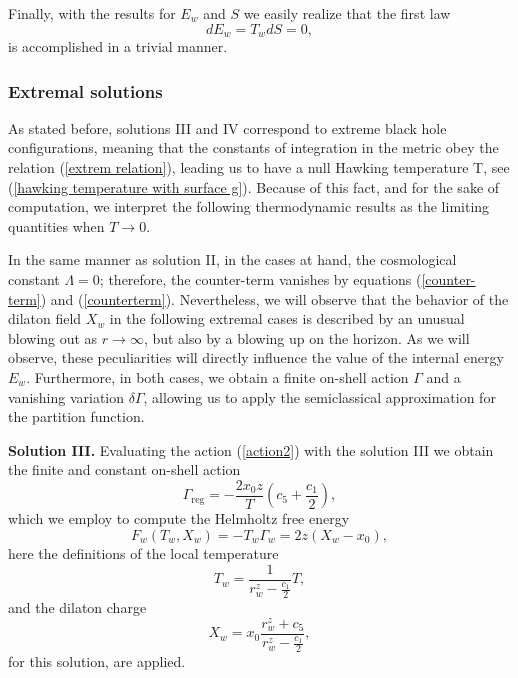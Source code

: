 \documentclass[sn-mathphys,Numbered]{sn-jnl}%
\theoremstyle{thmstyleone}%
\theoremstyle{thmstyletwo}%
\theoremstyle{thmstylethree}%
\begin{document}
Finally, with the results for $E_w$ and $S$ we easily  realize that the first law 
%
\begin{equation}
    dE_w=T_wdS=0,
\end{equation}
%
is accomplished in a trivial manner.

   \subsubsection{Extremal solutions}


As stated before, solutions III and IV correspond to extreme black hole configurations, meaning that the constants of integration in the metric obey the relation (\ref{extrem relation}), leading us to have a null Hawking temperature T, see (\ref{hawking temperature with surface g}). Because of this fact, and for the sake of computation, we interpret the following thermodynamic results as the limiting quantities when $T \rightarrow 0$.

In the same manner as solution II, in the cases at hand, the cosmological constant $\Lambda=0$; therefore, the counter-term vanishes by equations (\ref{counter-term}) and (\ref{counterterm}). Nevertheless, we will observe that the behavior of the dilaton field $X_w$ in the following extremal cases is described by an unusual blowing out as $r \rightarrow \infty$, but also by a blowing up on the horizon. As we will observe, these peculiarities will directly influence the value of the internal energy $E_w$. Furthermore, in both cases, we obtain a finite on-shell action $\Gamma$ and a vanishing variation $\delta \Gamma$, allowing us to apply the semiclassical approximation for the partition function.

\textbf{Solution III.} Evaluating the action (\ref{action2}) with the solution III we obtain the finite and constant on-shell action
\begin{equation}
    \Gamma_{\text{reg}}=-\frac{2x_0 z}{T} \left(c_5+\frac{c_1}{2}\right),
\end{equation}
%
which we employ to compute the Helmholtz free energy
\begin{equation}\label{free energy solII}
    F_w(T_w,X_w)=-T_w \Gamma_w=2z\left(X_w-x_0\right),
\end{equation}
here the definitions of the local temperature
\begin{equation}
    T_w=\frac{1}{r_w^z-\frac{c_1}{2}} T,
\end{equation}
and the dilaton charge
\begin{equation}
    X_w= x_0 \frac{r_w^z+c_5}{r_w^z-\frac{c_1}{2}},
\end{equation}
for this solution, are applied.
\end{document}
